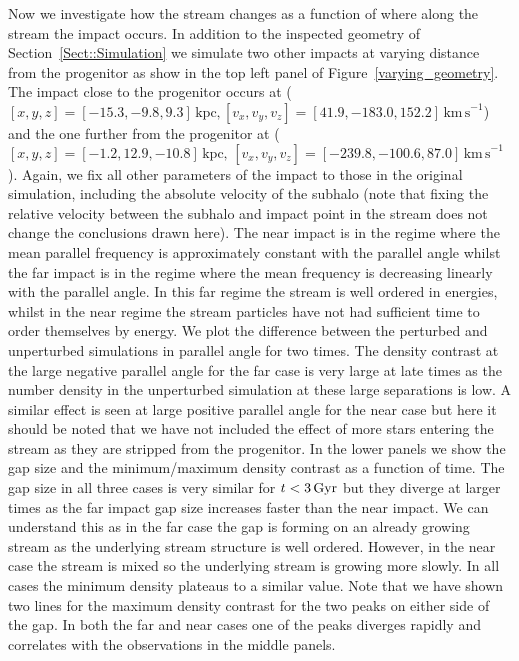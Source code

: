 \documentclass[useAMS,usenatbib,fleqn,a4paper]{mn2e}
\def\Gyr{\,{\rm Gyr}}
\begin{document}
Now we investigate how the stream changes as a function of where along the stream the impact occurs. In addition to the inspected geometry of Section~\ref{Sect::Simulation} we simulate two other impacts at varying distance from the progenitor as show in the top left panel of Figure~\ref{varying_geometry}. The impact close to the progenitor occurs at ($[x,y,z]=[-15.3,-9.8,9.3]\,\mathrm{kpc},[v_x,v_y,v_z]=[41.9,-183.0,152.2]\,\mathrm{km\,s}^{-1}$) and the one further from the progenitor at ($[x,y,z]=[-1.2,12.9,-10.8]\,\mathrm{kpc},\,[v_x,v_y,v_z]=[-239.8,-100.6,87.0]\,\mathrm{km\,s}^{-1}$). Again, we fix all other parameters of the impact to those in the original simulation, including the absolute velocity of the subhalo (note that fixing the relative velocity between the subhalo and impact point in the stream does not change the conclusions drawn here). The near impact is in the regime where the mean parallel frequency is approximately constant with the parallel angle whilst the far impact is in the regime where the mean frequency is decreasing linearly with the parallel angle. In this far regime the stream is well ordered in energies, whilst in the near regime the stream particles have not had sufficient time to order themselves by energy. We plot the difference between the perturbed and unperturbed simulations in parallel angle for two times. The density contrast at the large negative parallel angle for the far case is very large at late times as the number density in the unperturbed simulation at these large separations is low. A similar effect is seen at large positive parallel angle for the near case but here it should be noted that we have not included the effect of more stars entering the stream as they are stripped from the progenitor. In the lower panels we show the gap size and the minimum/maximum density contrast as a function of time. The gap size in all three cases is very similar for $t<3\Gyr$ but they diverge at larger times as the far impact gap size increases faster than the near impact. We can understand this as in the far case the gap is forming on an already growing stream as the underlying stream structure is well ordered. However, in the near case the stream is mixed so the underlying stream is growing more slowly. In all cases the minimum density plateaus to a similar value. Note that we have shown two lines for the maximum density contrast for the two peaks on either side of the gap. In both the far and near cases one of the peaks diverges rapidly and correlates with the observations in the middle panels.
\end{document}
